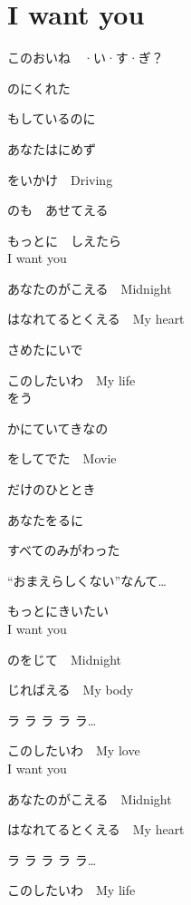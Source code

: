 \section{ I want you}
\large{

このおいね　·い·す·ぎ？

のにくれた

もしているのに

あなたはにめず

をいかけ　Driving

のも　あせてえる

もっとに　しえたら
\\

I want you

あなたのがこえる　Midnight

はなれてるとくえる　My heart

さめたにいで

このしたいわ　My life
\\

をう

かにていてきなの

をしてでた　Movie

だけのひととき

あなたをるに

すべてのみがわった

“おまえらしくない”なんて…

もっとにきいたい
\\

I want you

のをじて　Midnight

じればえる　My body

ラ ラ ラ ラ ラ…

このしたいわ　My love
\\

I want you

あなたのがこえる　Midnight

はなれてるとくえる　My heart

ラ ラ ラ ラ ラ…

このしたいわ　My life

}